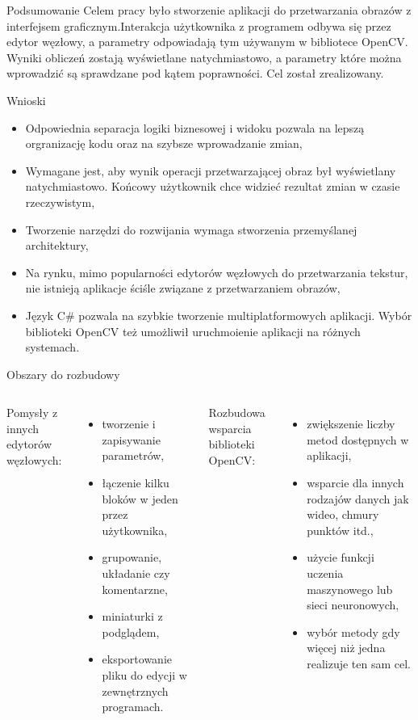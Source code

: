 \documentclass[aspectratio=1610,handout]{beamer}
\theoremstyle{definition}
\begin{document}
\begin{frame}{Podsumowanie}
    Celem pracy było stworzenie aplikacji do przetwarzania obrazów z interfejsem graficznym.Interakcja użytkownika z programem odbywa się przez edytor węzłowy, a parametry odpowiadają tym używanym w bibliotece OpenCV. Wyniki obliczeń zostają wyświetlane natychmiastowo, a parametry które można wprowadzić są sprawdzane pod kątem poprawności. Cel został zrealizowany.
\end{frame}

\begin{frame}{Wnioski}
    \begin{itemize}
        \item Odpowiednia separacja logiki biznesowej i widoku pozwala na lepszą orgranizację kodu oraz na szybsze wprowadzanie zmian,
        \item Wymagane jest, aby wynik operacji przetwarzającej obraz był wyświetlany natychmiastowo. Końcowy użytkownik chce widzieć rezultat zmian w czasie rzeczywistym,
        \item Tworzenie narzędzi do rozwijania wymaga stworzenia przemyślanej architektury,
        \item Na rynku, mimo popularności edytorów węzłowych do przetwarzania tekstur, nie istnieją aplikacje ściśle związane z przetwarzaniem obrazów,
        \item Język C\# pozwala na szybkie tworzenie multiplatformowych aplikacji. Wybór biblioteki OpenCV też umożliwił uruchmoienie aplikacji na różnych systemach.
    \end{itemize}
\end{frame}

\begin{frame}{Obszary do rozbudowy}
    \begin{columns}[t]
        Pomysły z innych edytorów węzłowych:
        \begin{itemize}
            \item tworzenie i zapisywanie parametrów,
            \item łączenie kilku bloków w jeden przez użytkownika,
            \item grupowanie, układanie czy komentarzne,
            \item miniaturki z podglądem,
            \item eksportowanie pliku do edycji w zewnętrznych programach.
        \end{itemize}
        Rozbudowa wsparcia biblioteki OpenCV:
        \begin{itemize}
            \item zwiększenie liczby metod dostępnych w aplikacji,
            \item wsparcie dla innych rodzajów danych jak wideo, chmury punktów itd.,
            \item użycie funkcji uczenia maszynowego lub sieci neuronowych,
            \item wybór metody gdy więcej niż jedna realizuje ten sam cel.
        \end{itemize}
    \end{columns}
\end{frame}
\end{document}
